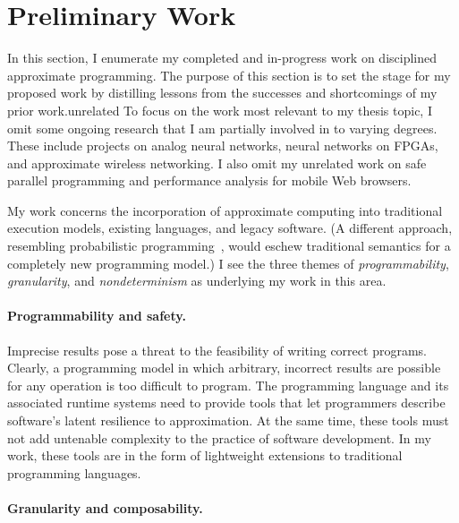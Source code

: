 \section{Preliminary Work}
\label{sec:prelim}

In this section, I enumerate my completed and in-progress work on
disciplined approximate programming. The purpose of this section is to set the stage
for my proposed work by distilling lessons from the successes and shortcomings
of my prior work.unrelated 
To focus on the work most relevant to my thesis topic, I omit some ongoing
research that I am partially involved in to varying degrees. These include
projects on analog neural networks, neural networks on FPGAs, and approximate
wireless networking.
I also omit my unrelated work on safe parallel programming and
performance analysis for mobile Web browsers.

My work concerns the incorporation of approximate computing
into traditional execution models, existing
languages, and legacy software.
(A different approach, resembling probabilistic
programming~\cite{church}, would eschew traditional semantics for a completely
new programming model.)
I see the three themes of \emph{programmability},
\emph{granularity}, and \emph{nondeterminism} as underlying my work in this
area.

\paragraph{Programmability and safety.}

Imprecise results pose a threat to the feasibility of writing correct
programs. Clearly, a programming model in which arbitrary, incorrect results
are possible for any operation is too difficult to program. The programming
language and its associated runtime systems need to provide tools that let
programmers describe software's latent resilience to approximation. At the
same time, these tools must not add
untenable
complexity to the practice of software development. In my work, these
tools are in the form of lightweight extensions to traditional programming
languages.

\paragraph{Granularity and composability.}

